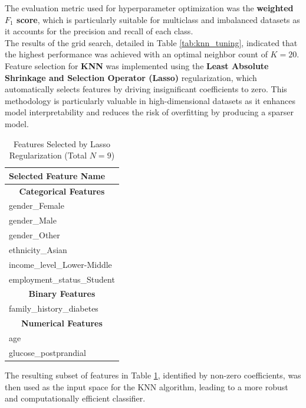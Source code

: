 \documentclass[conference]{IEEEtran}
\begin{document}
\indent The evaluation metric used for hyperparameter optimization was the \textbf{weighted $F_1$ score}, which is particularly suitable for multiclass and imbalanced datasets as it accounts for the precision and recall of each class.\\
\indent The results of the grid search, detailed in Table \ref{tab:knn_tuning}, indicated that the highest performance was achieved with an optimal neighbor count of $K=20$. \\

\indent Feature selection for \textbf{KNN} was implemented using the \textbf{Least Absolute Shrinkage and Selection Operator (Lasso)} regularization, which automatically selects features by driving insignificant coefficients to zero. This methodology is particularly valuable in high-dimensional datasets as it enhances model interpretability and reduces the risk of overfitting by producing a sparser model.\\

\begin{table}[htbp]
	\centering
	\caption{Features Selected by Lasso Regularization (Total $N=9$)}
	\label{tab:knn_selected_features}
	\begin{tabular}{| l |}
		\hline
		\textbf{Selected Feature Name} \\
		\hline
		\multicolumn{1}{|c|}{\textbf{Categorical Features}} \\ %
		\hline
		gender\_Female \\
		gender\_Male \\
		gender\_Other \\
		ethnicity\_Asian \\
		income\_level\_Lower-Middle \\
		employment\_status\_Student \\
		\hline
		\multicolumn{1}{|c|}{\textbf{Binary Features}} \\ %
		\hline
		family\_history\_diabetes \\
		\hline
		\multicolumn{1}{|c|}{\textbf{Numerical Features}} \\ %
		\hline
		age \\
		glucose\_postprandial \\
		\hline
	\end{tabular}
\end{table}

\indent The resulting subset of features in Table \ref{tab:knn_selected_features}, identified by non-zero coefficients, was then used as the input space for the KNN algorithm, leading to a more robust and computationally efficient classifier.\\
\end{document}
